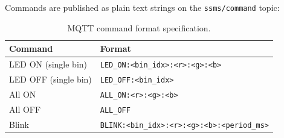 Commands are published as plain text strings on the \texttt{ssms/command} topic:

\begin{table}[H]
  \centering
  \caption{MQTT command format specification.}
  \label{tab:mqtt-commands}
  \begin{tabular}{p{4cm} p{8cm}}
    \toprule
    \textbf{Command} & \textbf{Format} \\
    \midrule
    LED ON (single bin) & \texttt{LED\_ON:<bin\_idx>:<r>:<g>:<b>} \\
    LED OFF (single bin) & \texttt{LED\_OFF:<bin\_idx>} \\
    All ON & \texttt{ALL\_ON:<r>:<g>:<b>} \\
    All OFF & \texttt{ALL\_OFF} \\
    Blink & \texttt{BLINK:<bin\_idx>:<r>:<g>:<b>:<period\_ms>} \\
    \bottomrule
  \end{tabular}
\end{table}
